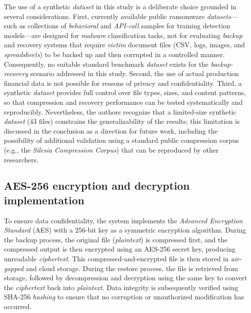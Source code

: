 \documentclass{iaesarticle}
\begin{document}
The use of a synthetic \textit{dataset} in this study is a deliberate choice grounded in several considerations. First, currently available public ransomware \textit{datasets}---such as collections of \textit{behavioral} and \textit{API-call} samples for training detection models---are designed for \textit{malware} classification tasks, not for evaluating \textit{backup} and recovery systems that require \textit{victim} document files (CSV, logs, images, and \textit{spreadsheets}) to be backed up and then corrupted in a controlled manner. Consequently, no suitable standard benchmark \textit{dataset} exists for the \textit{backup-recovery} scenario addressed in this study. Second, the use of actual production financial data is not possible for reasons of privacy and confidentiality. Third, a synthetic \textit{dataset} provides full control over file types, sizes, and content patterns, so that compression and recovery performance can be tested systematically and reproducibly. Nevertheless, the authors recognize that a limited-size synthetic \textit{dataset} (43 files) constrains the generalizability of the results; this limitation is discussed in the conclusion as a direction for future work, including the possibility of additional validation using a standard public compression corpus (e.g., the \textit{Silesia Compression Corpus}) that can be reproduced by other researchers.

\subsection{AES-256 encryption and decryption implementation}
To ensure data confidentiality, the system implements the \textit{Advanced Encryption Standard} (AES) with a 256-bit key as a symmetric encryption algorithm. During the backup process, the original file (\textit{plaintext}) is compressed first, and the compressed output is then encrypted using an AES-256 secret key, producing unreadable \textit{ciphertext}. This compressed-and-encrypted file is then stored in \textit{air-gapped} and cloud storage. During the restore process, the file is retrieved from storage, followed by decompression and decryption using the same key to convert the \textit{ciphertext} back into \textit{plaintext}. Data integrity is subsequently verified using SHA-256 \textit{hashing} to ensure that no corruption or unauthorized modification has occurred.
\end{document}
